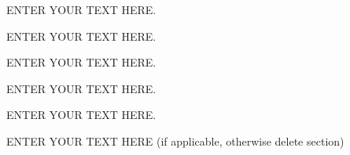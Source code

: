 \documentclass[12pt]{article}
\begin{document}
%
%
\justification          %
ENTER YOUR TEXT HERE.


%
%
\describeobservations   %
ENTER YOUR TEXT HERE.


%
%
\specialreq             %
ENTER YOUR TEXT HERE.


%
%
\coordinatedobs          %
ENTER YOUR TEXT HERE.


%
%
\duplications           %
ENTER YOUR TEXT HERE.


%
%
\describearchival       %
ENTER YOUR TEXT HERE (if applicable, otherwise delete section)
\end{document}
